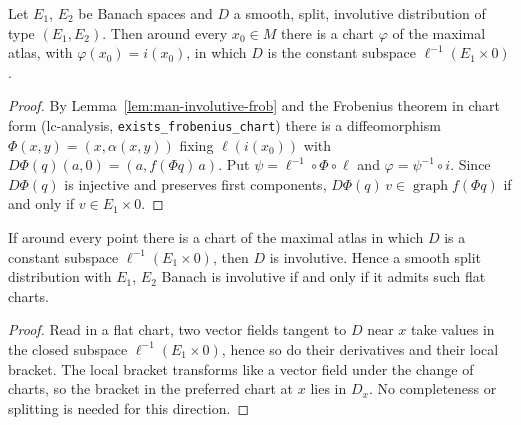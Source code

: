 \begin{theorem}
  \label{thm:man-frobenius}
  \leanok
  Let $E_1$, $E_2$ be Banach spaces and $D$ a smooth, split, involutive distribution of type
  $(E_1, E_2)$. Then around every $x_0 \in M$ there is a chart $\varphi$ of the maximal atlas, with
  $\varphi(x_0) = i(x_0)$, in which $D$ is the constant subspace $\ell^{-1}(E_1 \times 0)$.
\end{theorem}

\begin{proof}
  \leanok
  By Lemma~\ref{lem:man-involutive-frob} and the Frobenius theorem in chart form (lc-analysis,
  \texttt{exists\_frobenius\_chart}) there is a diffeomorphism $\Phi(x, y) = (x, \alpha(x, y))$
  fixing $\ell(i(x_0))$ with $D\Phi(q)(a, 0) = (a, f(\Phi q)\,a)$. Put
  $\psi = \ell^{-1} \circ \Phi \circ \ell$ and $\varphi = \psi^{-1} \circ i$. Since $D\Phi(q)$ is
  injective and preserves first components, $D\Phi(q)\,v \in \operatorname{graph} f(\Phi q)$ if and
  only if $v \in E_1 \times 0$.
\end{proof}

\begin{theorem}
  \label{thm:man-frobenius-converse}
  \leanok
  If around every point there is a chart of the maximal atlas in which $D$ is a constant subspace
  $\ell^{-1}(E_1 \times 0)$, then $D$ is involutive. Hence a smooth split distribution with
  $E_1$, $E_2$ Banach is involutive if and only if it admits such flat charts.
\end{theorem}

\begin{proof}
  \leanok
  Read in a flat chart, two vector fields tangent to $D$ near $x$ take values in the closed
  subspace $\ell^{-1}(E_1 \times 0)$, hence so do their derivatives and their local bracket. The
  local bracket transforms like a vector field under the change of charts, so the bracket in the
  preferred chart at $x$ lies in $D_x$. No completeness or splitting is needed for this direction.
\end{proof}
